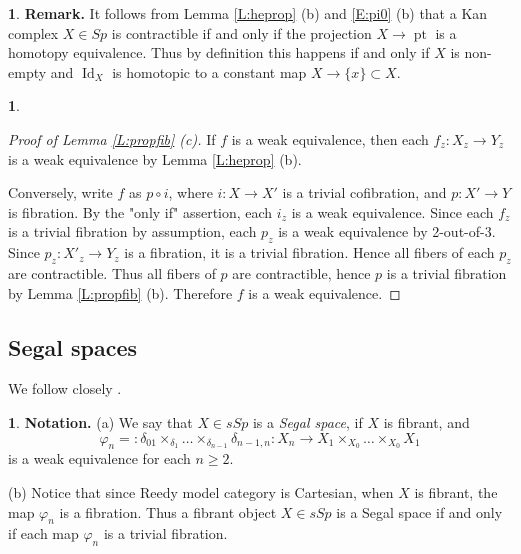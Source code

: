 \documentclass[12pt]{amsart}
\theoremstyle{plain}
\theoremstyle{definition}
\newtheorem{Emp}[Thm]{}
\numberwithin{equation}{section}
\newcommand{\dt}{\delta}
\newcommand{\rl}[1]{Lemma \ref{L:#1}}
\newcommand{\re}[1]{\ref{E:#1}}
\newcommand{\pt}{\operatorname{pt}}
\newcommand{\Id}{\operatorname{Id}}
\begin{document}
\begin{Emp} \label{E:contr}
{\bf Remark.} It follows from \rl{heprop} (b) and \re{pi0} (b)
that a Kan complex $X\in Sp$ is contractible if and only if the
projection $X\to\pt$ is a homotopy equivalence. Thus by definition
this happens if and only if $X$ is non-empty and $\Id_X$ is
homotopic to a constant map $X\to\{x\}\subset X$.
\end{Emp}


\begin{Emp} \label{E:pfpropfib}
\begin{proof}[Proof of \rl{propfib} (c)]
If $f$ is a weak equivalence, then each $f_z:X_z\to Y_z$ is a
weak equivalence by \rl{heprop} (b).

Conversely, write $f$ as $p\circ i$, where $i:X\to X'$ 
is a trivial cofibration, and $p:X'\to Y$ is fibration. By the "only if" assertion, 
each $i_z$ is a weak equivalence. Since each $f_z$ is a trivial fibration by assumption,
each $p_z$ is a weak equivalence by 2-out-of-3. Since $p_z:X'_z\to Y_z$  is
a fibration, it is a trivial fibration. Hence all fibers of each $p_z$ are contractible.
Thus all fibers of $p$ are contractible, hence $p$ is a trivial
fibration by \rl{propfib} (b). Therefore $f$ is a weak equivalence.
\end{proof}
\end{Emp}

\subsection{Segal spaces} We follow closely \cite{Re}.

\begin{Emp} \label{E:Segal}
{\bf Notation.} (a) We say that $X\in sSp$ is a {\em Segal space},
if $X$ is fibrant, and
\[
\varphi_n=:\dt_{01}\times_{\dt_1}\ldots\times_{\dt_{n-1}}\dt_{n-1,n}:X_n\to
X_1\times_{X_0}\ldots\times _{X_0}X_1
\]
is a weak equivalence for each $n\geq 2$.

(b) Notice that since Reedy model category is Cartesian, when $X$
is fibrant, the map $\varphi_n$ is a fibration. Thus a
fibrant object $X\in sSp$ is a Segal space if and only if each map
$\varphi_n$ is a trivial fibration.
\end{Emp}
\end{document}

